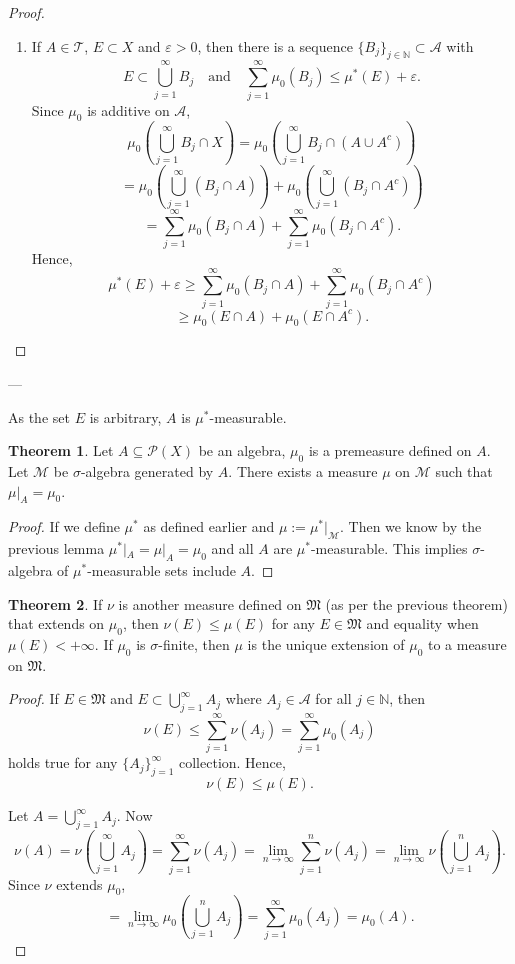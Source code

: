 \documentclass[11pt]{article}
\theoremstyle{definition}
\newtheorem{theorem}{Theorem}[section]
\theoremstyle{remark}
\begin{document}
\begin{proof}
\begin{enumerate}
\item If \(A \in \mathcal{T}\), \(E \subset X\) and \(\varepsilon > 0\), then there is a sequence \(\{B_j\}_{j \in \mathbb{N}} \subset \mathcal{A}\) with
\[
E \subset \bigcup_{j=1}^\infty B_j \quad \text{and} \quad \sum_{j=1}^\infty \mu_0(B_j) \leq \mu^*(E) + \varepsilon.
\]
Since \(\mu_0\) is additive on \(\mathcal{A}\),
\[
\mu_0\left(\bigcup_{j=1}^\infty B_j \cap X\right) = \mu_0\left(\bigcup_{j=1}^\infty B_j \cap (A \cup A^c)\right)
\]
\[
= \mu_0\left(\bigcup_{j=1}^\infty (B_j \cap A)\right) + \mu_0\left(\bigcup_{j=1}^\infty (B_j \cap A^c)\right)
\]
\[
= \sum_{j=1}^\infty \mu_0(B_j \cap A) + \sum_{j=1}^\infty \mu_0(B_j \cap A^c).
\]
Hence,
\[
\mu^*(E) + \varepsilon \geq \sum_{j=1}^\infty \mu_0(B_j \cap A) + \sum_{j=1}^\infty \mu_0(B_j \cap A^c)
\]
\[
\geq \mu_0(E \cap A) + \mu_0(E \cap A^c).
\]
\end{enumerate}
\end{proof}
---

As the set $E$ is arbitrary, $A$ is $\mu^*$-measurable.

\begin{theorem}\label{thm:measure_extension}
Let $A \subseteq \mathcal{P}(X)$ be an algebra, $\mu_0$ is a premeasure defined on $A$. Let $\mathcal{M}$ be $\sigma$-algebra generated by $A$. There exists a measure $\mu$ on $\mathcal{M}$ such that $\mu|_A = \mu_0$.
\end{theorem}

\begin{proof}
If we define $\mu^*$ as defined earlier and $\mu := \mu^*|_{\mathcal{M}}$. Then we know by the previous lemma $\mu^*|_A = \mu|_A = \mu_0$ and all $A$ are $\mu^*$-measurable. This implies $\sigma$-algebra of $\mu^*$-measurable sets include $A$.
\end{proof}

\begin{theorem}\label{thm:measure_extension}
If $\nu$ is another measure defined on $\mathfrak{M}$ (as per the previous theorem) that extends on $\mu_0$, then $\nu(E) \leq \mu(E)$ for any $E \in \mathfrak{M}$ and equality when $\mu(E) < +\infty$. If $\mu_0$ is $\sigma$-finite, then $\mu$ is the unique extension of $\mu_0$ to a measure on $\mathfrak{M}$.
\end{theorem}

\begin{proof}
If $E \in \mathfrak{M}$ and $E \subset \bigcup_{j=1}^\infty A_j$ where $A_j \in \mathcal{A}$ for all $j \in \mathbb{N}$, then
\[
\nu(E) \leq \sum_{j=1}^\infty \nu(A_j) = \sum_{j=1}^\infty \mu_0(A_j)
\]
holds true for any $\{A_j\}_{j=1}^\infty$ collection. Hence,
\[
\nu(E) \leq \mu(E).
\]

Let $A = \bigcup_{j=1}^\infty A_j$. Now
\[
\nu(A) = \nu\left(\bigcup_{j=1}^\infty A_j\right) = \sum_{j=1}^\infty \nu(A_j) = \lim_{n \to \infty} \sum_{j=1}^n \nu(A_j) = \lim_{n \to \infty} \nu\left(\bigcup_{j=1}^n A_j\right).
\]
Since $\nu$ extends $\mu_0$,
\[
= \lim_{n \to \infty} \mu_0\left(\bigcup_{j=1}^n A_j\right) = \sum_{j=1}^\infty \mu_0(A_j) = \mu_0(A).
\]
\end{proof}
\end{document}
